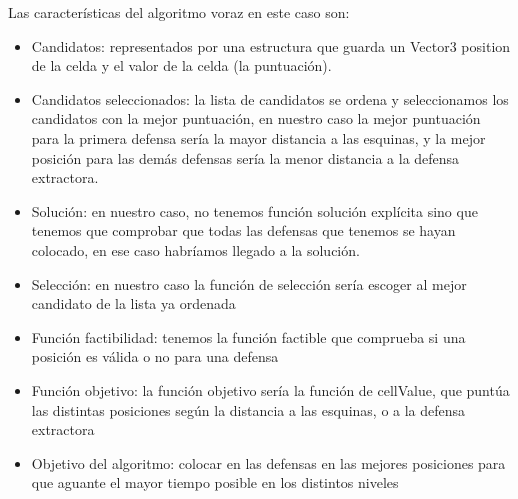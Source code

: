 Las características del algoritmo voraz en este caso son:

\begin{itemize}
    \item Candidatos: representados por una estructura que guarda un Vector3 position de la celda y el valor de la celda (la puntuación).
    \item Candidatos seleccionados: la lista de candidatos se ordena y seleccionamos los candidatos con la mejor puntuación, en nuestro caso la mejor puntuación para la primera defensa sería la mayor distancia a las esquinas, y la mejor posición para las demás defensas sería la menor distancia a la defensa extractora.
    \item Solución: en nuestro caso, no tenemos función solución explícita sino que tenemos que comprobar que todas las defensas que tenemos se hayan colocado, en ese caso habríamos llegado a la solución.
    \item Selección: en nuestro caso la función de selección sería escoger al mejor candidato de la lista ya ordenada
    \item Función factibilidad: tenemos la función factible que comprueba si una posición es válida o no para una defensa
    \item Función objetivo: la función objetivo sería la función de cellValue, que puntúa las distintas posiciones según la distancia a las esquinas, o a la defensa extractora
    \item Objetivo del algoritmo: colocar en las defensas en las mejores posiciones para que aguante el mayor tiempo posible en los distintos niveles


\end{itemize}